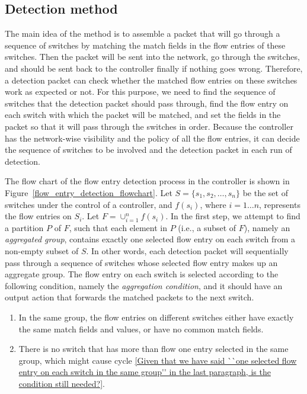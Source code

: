 \subsection{Detection method}
\label{Detection_method}
The main idea of the method is to assemble a packet that will go through a sequence of switches by matching the match fields in the flow entries of these switches. Then the packet will be sent into the network, go through the switches, and should be sent back to the controller finally if nothing goes wrong. Therefore, a detection packet can check whether the matched flow entries on these switches work as expected or not. For this purpose, we need to find the sequence of switches that the detection packet should pass through, find the flow entry on each switch with which the packet will be matched, and set the fields in the packet so that it will pass through the switches in order.  Because the controller has the network-wise visibility and the policy of all the flow entries, it can decide the sequence of switches to be involved and the detection packet in each run of detection.   

The flow chart of the flow entry detection process in the controller is shown in Figure~\ref{flow_entry_detection_flowchart}. Let $S=\{s_1,s_2,\ldots,s_n\}$ be the set of switches under the control of a controller, and $f(s_i)$, where $i=1\ldots n$, represents the flow entries on $S_i$. Let $F=\cup_{i=1}^n f(s_i)$. In the first step, we attempt to find a partition $P$ of $F$, such that each element in $P$ (i.e., a subset of $F$), namely an \textit{aggregated group}, contains exactly one selected flow entry on each switch from a non-empty subset of $S$. In other words, each detection packet will sequentially pass through a sequence of switches whose selected flow entry makes up an aggregate group. The flow entry on each switch is selected according to the following condition, namely the \textit{aggregation condition}, and it should have an output action that forwards the matched packets to the next switch.

\begin{enumerate}
\item
In the same group, the flow entries on different switches either have exactly the same match fields and values, or have no common match fields.
\item
There is no switch that has more than flow one entry selected in the same group, which might cause cycle \ref{Given that we have said ``one selected flow entry on each switch in the same group'' in the last paragraph, is the condition still needed?}.
\end{enumerate}

